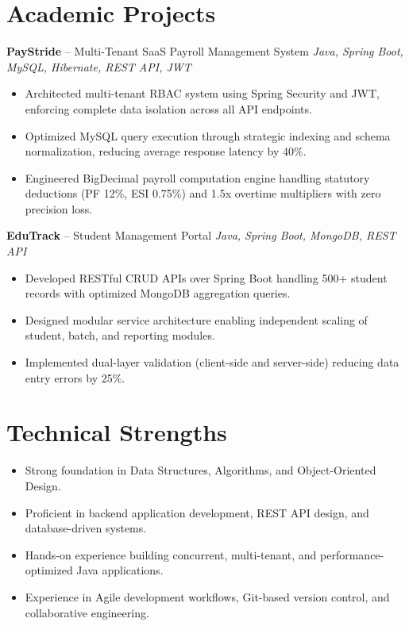 \documentclass[10.5pt,a4paper]{article}
\begin{document}
\section{Academic Projects}
\textbf{PayStride} -- Multi-Tenant SaaS Payroll Management System \hfill \textit{Java, Spring Boot, MySQL, Hibernate, REST API, JWT}
\begin{itemize}
  \item Architected multi-tenant RBAC system using Spring Security and JWT, enforcing complete data isolation across all API endpoints.
  \item Optimized MySQL query execution through strategic indexing and schema normalization, reducing average response latency by 40\%.
  \item Engineered BigDecimal payroll computation engine handling statutory deductions (PF 12\%, ESI 0.75\%) and 1.5x overtime multipliers with zero precision loss.
\end{itemize}
\vspace{2pt}
\textbf{EduTrack} -- Student Management Portal \hfill \textit{Java, Spring Boot, MongoDB, REST API}
\begin{itemize}
  \item Developed RESTful CRUD APIs over Spring Boot handling 500+ student records with optimized MongoDB aggregation queries.
  \item Designed modular service architecture enabling independent scaling of student, batch, and reporting modules.
  \item Implemented dual-layer validation (client-side and server-side) reducing data entry errors by 25\%.
\end{itemize}
\section{Technical Strengths}
\begin{itemize}
  \item Strong foundation in Data Structures, Algorithms, and Object-Oriented Design.
  \item Proficient in backend application development, REST API design, and database-driven systems.
  \item Hands-on experience building concurrent, multi-tenant, and performance-optimized Java applications.
  \item Experience in Agile development workflows, Git-based version control, and collaborative engineering.
\end{itemize}
\end{document}
